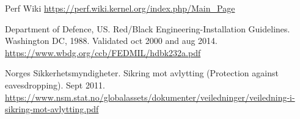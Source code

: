 \renewcommand*{\bibname}{References}



\begin{thebibliography}{18}




 Perf Wiki
\url{https://perf.wiki.kernel.org/index.php/Main_Page}



 Department of Defence, US. Red/Black Engineering-Installation Guidelines. Washington DC, 1988. Validated oct 2000 and aug 2014.
\url{https://www.wbdg.org/ccb/FEDMIL/hdbk232a.pdf}

 Norges Sikkerhetsmyndigheter. Sikring mot avlytting (Protection against eavesdropping). Sept 2011. 
\url{https://www.nsm.stat.no/globalassets/dokumenter/veiledninger/veiledning-i-sikring-mot-avlytting.pdf}

\end{thebibliography}